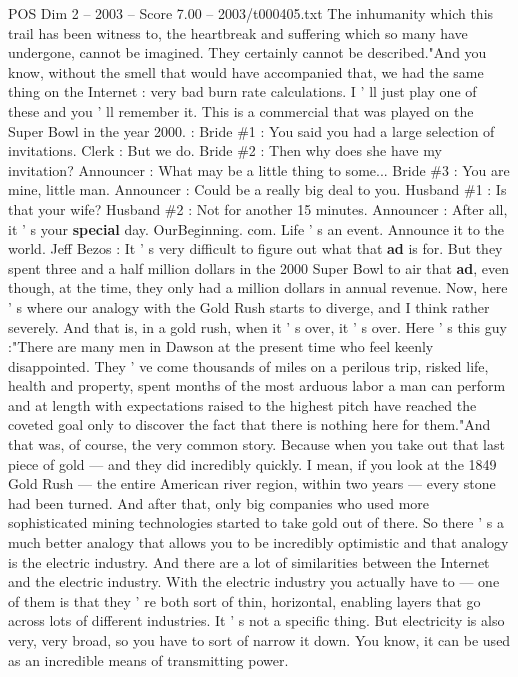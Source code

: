 \begin{textsample}{POS Dim 2 – 2003 – Score 7.00 – 2003/t000405.txt}
The inhumanity which this trail has been witness to, the heartbreak and suffering which so many have undergone, cannot be imagined.
They certainly cannot be described."And you know, without the smell that would have accompanied that, we had the same thing on the Internet : very bad burn rate calculations.
I ' ll just play one of these and you ' ll remember it.
This is a commercial that was played on the Super Bowl in the year 2000. : Bride \#1 : You said you had a large selection of invitations.
Clerk : But we do.
Bride \#2 : Then why does she have my invitation?
Announcer : What may be a little thing to some...
Bride \#3 : You are mine, little man.
Announcer : Could be a really big deal to you.
Husband \#1 : Is that your wife?
Husband \#2 : Not for another 15 minutes.
Announcer : After all, it ' s your \textbf{special} day.
OurBeginning. com.
Life ' s an event.
Announce it to the world.
Jeff Bezos : It ' s very difficult to figure out what that \textbf{ad} is for.
But they spent three and a half million dollars in the 2000 Super Bowl to air that \textbf{ad}, even though, at the time, they only had a million dollars in annual revenue.
Now, here ' s where our analogy with the Gold Rush starts to diverge, and I think rather severely.
And that is, in a gold rush, when it ' s over, it ' s over.
Here ' s this guy :"There are many men in Dawson at the present time who feel keenly disappointed.
They ' ve come thousands of miles on a perilous trip, risked life, health and property, spent months of the most arduous labor a man can perform and at length with expectations raised to the highest pitch have reached the coveted goal only to discover the fact that there is nothing here for them."And that was, of course, the very common story.
Because when you take out that last piece of gold — and they did incredibly quickly.
I mean, if you look at the 1849 Gold Rush — the entire American river region, within two years — every stone had been turned.
And after that, only big companies who used more sophisticated mining technologies started to take gold out of there.
So there ' s a much better analogy that allows you to be incredibly optimistic and that analogy is the electric industry.
And there are a lot of similarities between the Internet and the electric industry.
With the electric industry you actually have to — one of them is that they ' re both sort of thin, horizontal, enabling layers that go across lots of different industries.
It ' s not a specific thing.
But electricity is also very, very broad, so you have to sort of narrow it down.
You know, it can be used as an incredible means of transmitting power.

\end{textsample}
